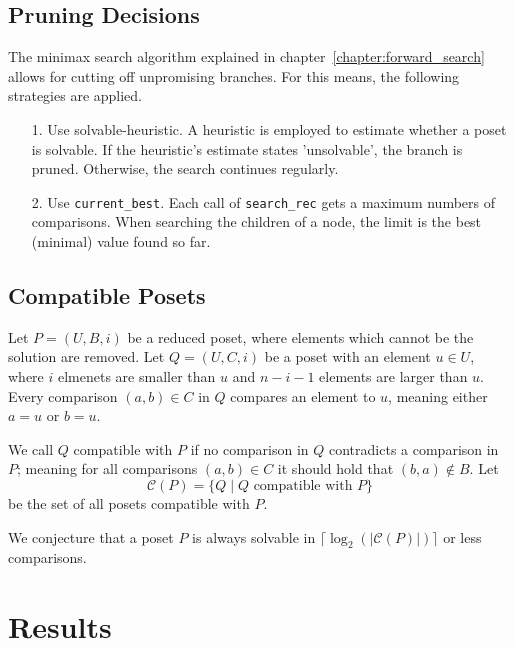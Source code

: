 \documentclass[10pt,journal,compsoc]{IEEEtran}
\begin{document}


\subsection{Pruning Decisions}
The minimax search algorithm explained in chapter~\ref{chapter:forward_search} allows for cutting off unpromising branches. For this means, the following strategies are applied.

\begin{enumerate}
  \item[1.]
    Use solvable-heuristic. A heuristic is employed to estimate whether a poset is solvable. If the heuristic's estimate states 'unsolvable', the branch is pruned.
    Otherwise, the search continues regularly.
  \item[2.]
    Use \texttt{current\_best}. Each call of \texttt{search\_rec} gets a maximum numbers of comparisons.
    When searching the children of a node, the limit is the best (minimal) value found so far.
\end{enumerate}

\subsection{Compatible Posets}

Let $P = (U, B, i)$ be a reduced poset, where elements which cannot be the solution are removed.
Let $Q = (U, C, i)$ be a poset with an element $u \in U$, where $i$ elmenets are smaller than $u$ and $n-i-1$ elements are larger than $u$.
Every comparison $(a,b) \in C$ in $Q$ compares an element to $u$, meaning either $a = u$ or $b = u$.

We call $Q$ compatible with $P$ if no comparison in $Q$ contradicts a comparison in $P$; meaning for all comparisons $(a,b) \in C$ it should hold that $(b,a) \not\in B$.
Let $$\mathcal{C}(P) = \{Q \mid Q \text{ compatible with } P\}$$ be the set of all posets compatible with $P$.

We conjecture that a poset $P$ is always solvable in $\lceil\log_2(|\mathcal{C}(P)|)\rceil$ or less comparisons.

\section{Results}
\end{document}
